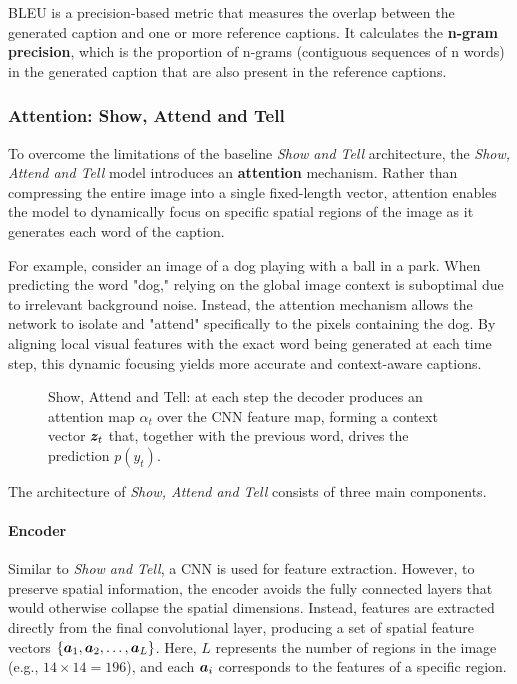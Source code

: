 BLEU is a precision-based metric that measures the overlap between the generated caption and one or more reference captions.
It calculates the \textbf{n-gram precision}, which is the proportion of n-grams (contiguous sequences of n words)
in the generated caption that are also present in the reference captions.


\subsubsection{Attention: Show, Attend and Tell}

To overcome the limitations of the baseline \textit{Show and Tell} architecture, the \textit{Show, Attend and Tell} model introduces an \textbf{attention} mechanism.
Rather than compressing the entire image into a single fixed-length vector, attention enables the model to dynamically focus on specific spatial regions of the image as it generates each word of the caption.

For example, consider an image of a dog playing with a ball in a park.
When predicting the word "dog," relying on the global image context is suboptimal due to irrelevant background noise.
Instead, the attention mechanism allows the network to isolate and "attend" specifically to the pixels containing the dog.
By aligning local visual features with the exact word being generated at each time step, this dynamic focusing yields more accurate and context-aware captions.

\begin{figure}[H]
    \centering
    
    \caption{Show, Attend and Tell: at each step the decoder produces an attention map $\alpha_t$ over the CNN feature map, forming a context vector $\boldsymbol{z}_t$ that, together with the previous word, drives the prediction $p(y_t)$.}
\end{figure}

The architecture of \textit{Show, Attend and Tell} consists of three main components.

\paragraph{Encoder}
Similar to \textit{Show and Tell}, a CNN is used for feature extraction.
However, to preserve spatial information, the encoder avoids the fully connected layers that would otherwise collapse the spatial dimensions.
Instead, features are extracted directly from the final convolutional layer, producing a set of spatial feature vectors $\{\boldsymbol{a}_1, \boldsymbol{a}_2, \dots, \boldsymbol{a}_L\}$.
Here, $L$ represents the number of regions in the image (e.g., $14 \times 14 = 196$), and each $\boldsymbol{a}_i$ corresponds to the features of a specific region.

